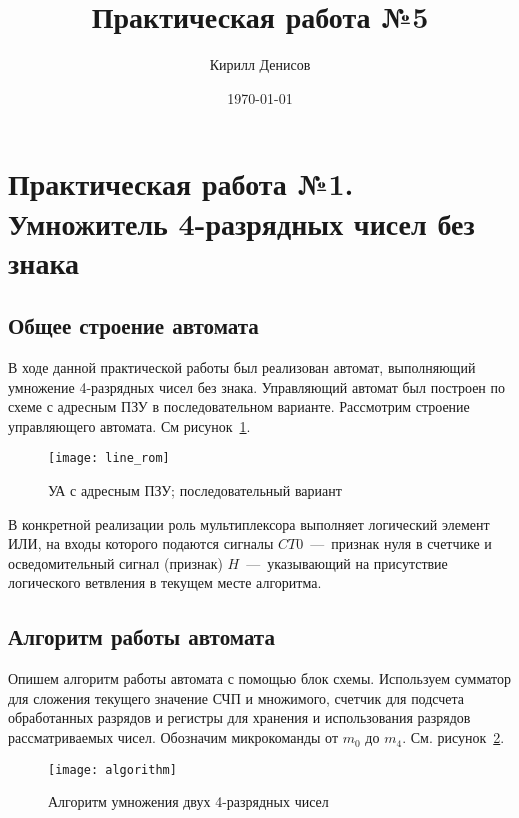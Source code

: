 \documentclass[a4paper,14pt]{extarticle}
\author{Кирилл Денисов}
\title{Практическая работа №5}
\date{\today}
\newcommand{\pathToCommonFolder}{../../Common}
\begin{document}
	\def\contentsname{ОГЛАВЛЕНИЕ}
	\thispagestyle{empty}
	
	
	
	\newpage
	\tableofcontents
	\newpage
	
\section{Практическая работа №1. \\Умножитель 4-разрядных чисел без знака}
\subsection{Общее строение автомата}
В ходе данной практической работы был реализован автомат, выполняющий умножение 4-разрядных чисел без знака. Управляющий автомат был построен по схеме с адресным ПЗУ в последовательном варианте. Рассмотрим строение управляющего автомата. См рисунок~\ref{img:scheme1}.

\begin{figure}[h!]
	\begin{center}
		\texttt{[image: line\_rom]}
		\caption{УА с адресным ПЗУ; последовательный вариант}
		\label{img:scheme1}
	\end{center}	
\end{figure}

В конкретной реализации роль мультиплексора выполняет логический элемент ИЛИ, на входы которого подаются сигналы $CT0$~---~признак нуля в счетчике и осведомительный сигнал (признак) $H$~---~указывающий на присутствие логического ветвления в текущем месте алгоритма.

\subsection{Алгоритм работы автомата}
Опишем алгоритм работы автомата с помощью блок схемы. Используем сумматор для сложения текущего значение СЧП и множимого, счетчик для подсчета обработанных разрядов и регистры для хранения и использования разрядов рассматриваемых чисел. Обозначим микрокоманды от $m_0$ до $m_4$. См. рисунок~\ref{img:algorithm1}.\vspace{2ex}

\begin{figure}[h!]
	\centering
	\texttt{[image: algorithm]}
	\caption {Алгоритм умножения двух 4-разрядных чисел}
	\label{img:algorithm1}
\end{figure}
\end{document}
